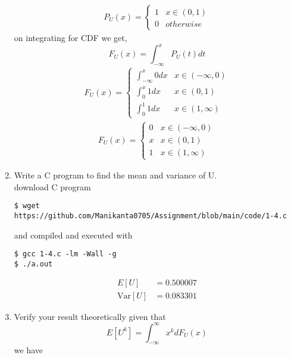 \documentclass[journal,12pt,twocolumn]{IEEEtran}
\renewcommand\thesection{\arabic{section}}
\begin{document}
\begin{enumerate}[label=\thesection.\arabic*.,ref=\thesection.\theenumi]
    \begin{align}
    P_U(x) =  \begin{cases}
        1 & x \in (0,1) \\
        0 & otherwise
    \end{cases} 
    \end{align}
    on integrating for CDF we get,
   \begin{equation}
    F_U(x) = \int_{-\infty}^{x}P_U(t)dt
   \end{equation} 
   \begin{align}
    F_U(x) =  \begin{cases}
        \int_{-\infty}^{x}0 dx   & x \in (-\infty,0)\\
        \int_{0}^x 1dx & x \in (0,1) \\
         \int_{0}^1 1dx & x \in (1,\infty)
    \end{cases} 
    \end{align}
    \begin{align}
    F_U(x) =  \begin{cases}
        0 & x \in (-\infty,0)\\
        x & x \in (0,1) \\
        1 & x \in (1,\infty)
    \end{cases} 
    \end{align}
\item Write a C program to find the mean and variance of U.\\
\solution download C program
\begin{lstlisting}
$ wget https://github.com/Manikanta0705/Assignment/blob/main/code/1-4.c
        \end{lstlisting}
        and compiled and executed with
        \begin{lstlisting}
$ gcc 1-4.c -lm -Wall -g
$ ./a.out
        \end{lstlisting}
    \begin{align}
        E[U] &= 0.500007  \label{eq:1.4.1}\\
        \text{Var}[U] &= 0.083301 \label{eq:1.4.2}
    \end{align}
\item Verify your result theoretically given that 
    \begin{equation}
        E[U^k] = \int_{- \infty}^{\infty} x^k dF_U(x)
    \end{equation}
    \solution we have 

\end{enumerate}
\end{document}
